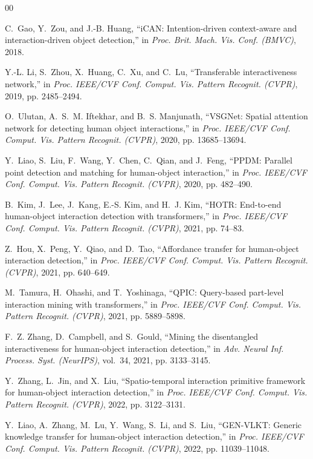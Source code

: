 \documentclass[conference]{IEEEtran}
\begin{document}

\begin{thebibliography}{00}

C.~Gao, Y.~Zou, and J.-B. Huang, ``iCAN: Intention-driven context-aware and interaction-driven object detection,'' in \emph{Proc. Brit. Mach. Vis. Conf. (BMVC)}, 2018.

Y.-L. Li, S.~Zhou, X.~Huang, C.~Xu, and C.~Lu, ``Transferable interactiveness network,'' in \emph{Proc. IEEE/CVF Conf. Comput. Vis. Pattern Recognit. (CVPR)}, 2019, pp. 2485--2494.

O.~Ulutan, A.~S.~M. Iftekhar, and B.~S. Manjunath, ``VSGNet: Spatial attention network for detecting human object interactions,'' in \emph{Proc. IEEE/CVF Conf. Comput. Vis. Pattern Recognit. (CVPR)}, 2020, pp. 13685--13694.

Y.~Liao, S.~Liu, F.~Wang, Y.~Chen, C.~Qian, and J.~Feng, ``PPDM: Parallel point detection and matching for human-object interaction,'' in \emph{Proc. IEEE/CVF Conf. Comput. Vis. Pattern Recognit. (CVPR)}, 2020, pp. 482--490.

B.~Kim, J.~Lee, J.~Kang, E.-S. Kim, and H.~J. Kim, ``HOTR: End-to-end human-object interaction detection with transformers,'' in \emph{Proc. IEEE/CVF Conf. Comput. Vis. Pattern Recognit. (CVPR)}, 2021, pp. 74--83.

Z.~Hou, X.~Peng, Y.~Qiao, and D.~Tao, ``Affordance transfer for human-object interaction detection,'' in \emph{Proc. IEEE/CVF Conf. Comput. Vis. Pattern Recognit. (CVPR)}, 2021, pp. 640--649.

M.~Tamura, H.~Ohashi, and T.~Yoshinaga, ``QPIC: Query-based part-level interaction mining with transformers,'' in \emph{Proc. IEEE/CVF Conf. Comput. Vis. Pattern Recognit. (CVPR)}, 2021, pp. 5889--5898.

F.~Z. Zhang, D.~Campbell, and S.~Gould, ``Mining the disentangled interactiveness for human-object interaction detection,'' in \emph{Adv. Neural Inf. Process. Syst. (NeurIPS)}, vol.~34, 2021, pp. 3133--3145.

Y.~Zhang, L.~Jin, and X.~Liu, ``Spatio-temporal interaction primitive framework for human-object interaction detection,'' in \emph{Proc. IEEE/CVF Conf. Comput. Vis. Pattern Recognit. (CVPR)}, 2022, pp. 3122--3131.

Y.~Liao, A.~Zhang, M.~Lu, Y.~Wang, S.~Li, and S.~Liu, ``GEN-VLKT: Generic knowledge transfer for human-object interaction detection,'' in \emph{Proc. IEEE/CVF Conf. Comput. Vis. Pattern Recognit. (CVPR)}, 2022, pp. 11039--11048.


\end{thebibliography}
\end{document}
